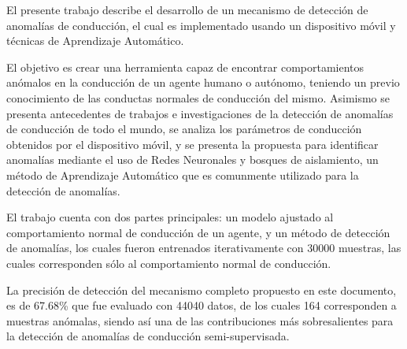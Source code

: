 \bigskip
El presente trabajo describe el desarrollo de un mecanismo de detecci\'{o}n de anomal\'{i}as de conducci\'{o}n, el cual es implementado usando un dispositivo m\'{o}vil y t\'{e}cnicas de Aprendizaje Autom\'{a}tico. 

El objetivo es crear una herramienta capaz de encontrar comportamientos an\'{o}malos en la conducci\'{o}n de un agente humano o aut\'{o}nomo, teniendo un previo conocimiento de las conductas normales de conducci\'{o}n del mismo. Asimismo se presenta antecedentes de trabajos e investigaciones de la detecci\'{o}n de anomal\'{i}as de conducci\'{o}n de todo el mundo, se analiza los par\'{a}metros de conducci\'{o}n obtenidos por el dispositivo m\'{o}vil, y se presenta la propuesta para identificar anomal\'{i}as mediante el uso de Redes Neuronales y bosques de aislamiento, un m\'{e}todo de Aprendizaje Autom\'{a}tico que es comunmente utilizado para la detecci\'{o}n de anomal\'{i}as.

El trabajo cuenta con dos partes principales: un modelo ajustado al comportamiento normal de conducci\'{o}n de un agente, y un m\'{e}todo de detecci\'{o}n de anomal\'{i}as, los cuales fueron entrenados iterativamente con 30000 muestras, las cuales corresponden s\'{o}lo al comportamiento normal de conducci\'{o}n.

La precisi\'{o}n de detecci\'{o}n del mecanismo completo propuesto en este documento, es de 67.68\% que fue evaluado con 44040 datos, de los cuales 164 corresponden a muestras an\'{o}malas, siendo as\'{i} una de las contribuciones m\'{a}s sobresalientes para la detecci\'{o}n de anomal\'{i}as de conducci\'{o}n semi-supervisada.





